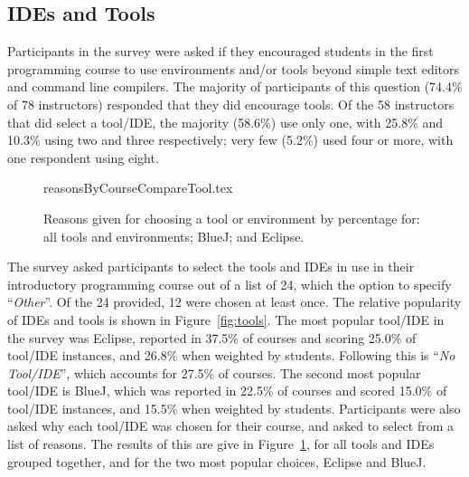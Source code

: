 \documentclass{sig-alternate}
\begin{document}
\subsection{IDEs and Tools}


Participants in the survey were asked if they encouraged students in
the first programming course to use environments and/or tools beyond
simple text editors and command line compilers. The majority of
participants of this question (74.4\% of 78 instructors) responded
that they did encourage tools. Of the 58 instructors that did select a
tool/IDE, the majority (58.6\%) use only one, with 25.8\% and 10.3\%
using two and three respectively; very few (5.2\%) used four or more,
with one respondent using eight.


\begin{figure}[ht]
\begin{center}\vskip-12pt
{reasonsByCourseCompareTool.tex}
\end{center}\vskip-18pt
\caption{Reasons given for choosing a tool or environment by percentage for: all tools and environments; BlueJ; and Eclipse.\label{fig:reasonsTools}}
\end{figure}

The survey asked participants to select the tools and IDEs in use in
their introductory programming course out of a list of 24, which the
option to specify ``{\emph{Other}}''. Of the 24 provided, 12 were
chosen at least once. The relative popularity of IDEs and tools is
shown in Figure~\ref{fig:tools}. The most popular tool/IDE in the
survey was Eclipse, reported in 37.5\% of courses and scoring 25.0\%
of tool/IDE instances, and 26.8\% when weighted by students. Following
this is ``{\emph{No Tool/IDE}}'', which accounts for 27.5\% of
courses. The second most popular tool/IDE is BlueJ, which was reported
in 22.5\% of courses and scored 15.0\% of tool/IDE instances, and
15.5\% when weighted by students. Participants were also asked why
each tool/IDE was chosen for their course, and asked to select from a
list of reasons. The results of this are give in
Figure~\ref{fig:reasonsTools}, for all tools and IDEs grouped
together, and for the two most popular choices, Eclipse and BlueJ.
\end{document}

